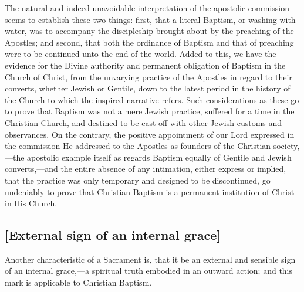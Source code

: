 \documentclass[
]{book}
\begin{document}
The natural and indeed unavoidable interpretation of the apostolic commission seems to establish these two things: first, that a literal Baptism, or washing with water, was to accompany the discipleship brought about by the preaching of the Apostles; and second, that both the ordinance of Baptism and that of preaching were to be continued unto the end of the world. Added to this, we have the evidence for the Divine authority and permanent obligation of Baptism in the Church of Christ, from the unvarying practice of the Apostles in regard to their converts, whether Jewish or Gentile, down to the latest period in the history of the Church to which the inspired narrative refers. Such considerations as these go to prove that Baptism was not a mere Jewish practice, suffered for a time in the Christian Church, and destined to be cast off with other Jewish customs and observances. On the contrary, the positive appointment of our Lord expressed in the commission He addressed to the Apostles as founders of the Christian society,---the apostolic example itself as regards Baptism equally of Gentile and Jewish converts,---and the entire absence of any intimation, either express or implied, that the practice was only temporary and designed to be discontinued, go undeniably to prove that Christian Baptism is a permanent institution of Christ in His Church.

\hypertarget{external-sign-of-an-internal-grace}{%
\subsection{{[}External sign of an internal grace{]}}\label{external-sign-of-an-internal-grace}}

Another characteristic of a Sacrament is, that it be an external and sensible sign of an internal grace,---a spiritual truth embodied in an outward action; and this mark is applicable to Christian Baptism.
\end{document}
